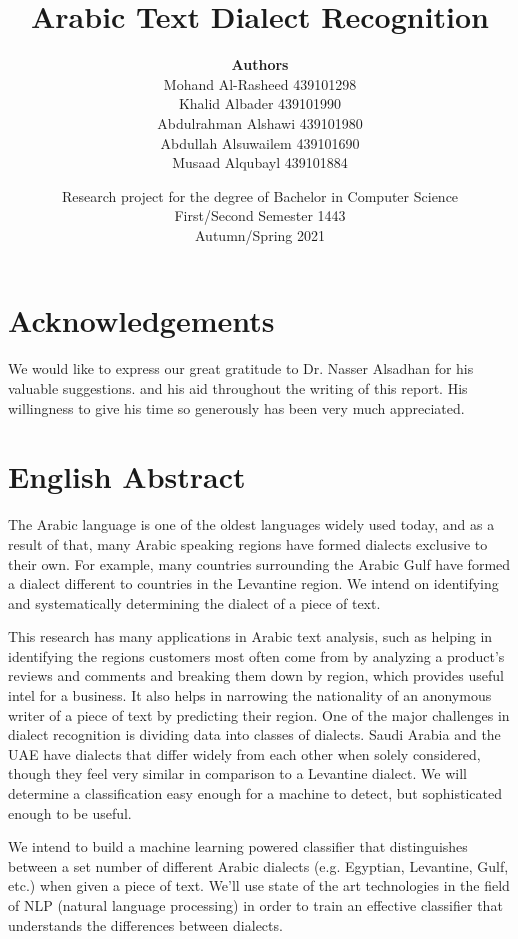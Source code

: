 \documentclass[12pt]{diazessay}
\title{\textbf{Arabic Text Dialect Recognition}}
\author{\textbf{Authors} \\ 
Mohand Al-Rasheed \hspace{15pt} 439101298\\
Khalid Albader \hspace{50pt}  439101990\\
Abdulrahman Alshawi \hspace{4pt}  439101980\\
Abdullah Alsuwailem \hspace{11pt}  439101690\\
Musaad Alqubayl \hspace{35pt}  439101884\\
}
\date{Research project for the degree of Bachelor in Computer Science \\
First/Second Semester 1443 \\
Autumn/Spring 2021}
\begin{document}
\maketitle 



\tableofcontents

\cleardoublepage

\section*{Acknowledgements}
We would like to express our great gratitude to Dr. Nasser Alsadhan for his valuable suggestions. and his aid throughout the writing of this report. His willingness to give his time so generously has been very much appreciated.

\section*{English Abstract}
The Arabic language is one of the oldest languages widely used today, and as a result of that, many Arabic speaking regions have formed dialects exclusive to their own. For example, many countries surrounding the Arabic Gulf have formed a dialect different to countries in the Levantine region. We intend on identifying and systematically determining the dialect of a piece of text. 

 This research has many applications in Arabic text analysis, such as helping in identifying the regions customers most often come from by analyzing a product’s reviews and comments and breaking them down by region, which provides useful intel for a business. It also helps in narrowing the nationality of an anonymous writer of a piece of text by predicting their region.
One of the major challenges in dialect recognition is dividing data into classes of dialects. Saudi Arabia and the UAE have dialects that differ widely from each other when solely considered, though they feel very similar in comparison to a Levantine dialect. We will determine a classification easy enough for a machine to detect, but sophisticated enough to be useful. 

We intend to build a machine learning powered classifier that distinguishes between a set number of different Arabic dialects (e.g. Egyptian, Levantine, Gulf, etc.) when given a piece of text. We’ll use state of the art technologies in the field of NLP (natural language processing) in order to train an effective classifier that understands the differences between dialects.
\end{document}
